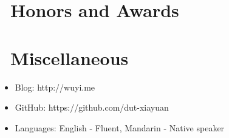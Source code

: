 \documentclass{resume}
\begin{document}
\section{\faHeartO\ Honors and Awards}

\section{\faInfo\ Miscellaneous}
\begin{itemize}[parsep=0.5ex]
  \item Blog: http://wuyi.me
  \item GitHub: https://github.com/dut-xiayuan
  \item Languages: English - Fluent, Mandarin - Native speaker
\end{itemize}

%
%
\end{document}
